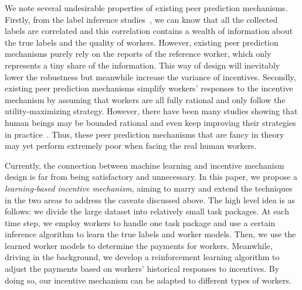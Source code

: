 We note several undesirable properties of existing peer prediction mechanisms.
Firstly, from the label inference studies~\cite{zheng2017truth}, we can know that all the collected labels are correlated and this correlation contains a wealth of information about the true labels and the quality of workers.
However, existing peer prediction mechanisms purely rely on the reports of the reference worker, which only represents a tiny share of the information.
This way of design will inevitably lower the robustness but meanwhile increase the variance of incentives.
Secondly, existing peer prediction mechanisms simplify workers' responses to the incentive mechanism by assuming that workers are all fully rational and only follow the utility-maximizing strategy.
However, there have been many studies showing that human beings may be bounded rational and even keep improving their strategies in practice~\cite{simon1982models,mckelvey1995quantal,chastain2014algorithms}.
Thus, these peer prediction mechanisms that are fancy in theory may yet perform extremely poor when facing the real human workers.

%
%
%



Currently, the connection between machine learning and incentive mechanism design is far from being satisfactory and unnecessary. In this paper, we propose a \emph{learning-based incentive mechanism}, aiming to marry and extend the techniques in the two areas to address the caveats discussed above.
The high level idea is as follows: we divide the large dataset into relatively small task packages. At each time step, we employ workers to handle one task package and use a certain inference algorithm to learn the true labels and worker models. Then, we use the learned worker models to determine the payments for workers. Meanwhile, driving in the background, we develop a reinforcement learning algorithm to adjust the payments based on workers' historical responses to incentives. By doing so, our incentive mechanism can be adapted to different types of workers.


